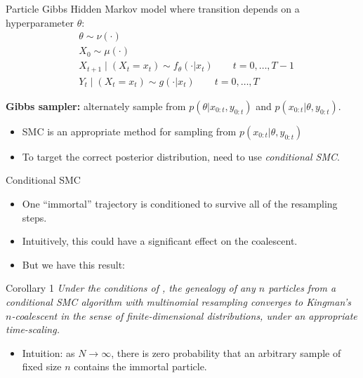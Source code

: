 \documentclass[aspectratio=169]{beamer}
\theoremstyle{definition}
\begin{document}
\begin{frame}{Particle Gibbs \citep{andrieu2010}}
Hidden Markov model where transition depends on a hyperparameter $\theta$:
\begin{align*}
& \theta \sim \nu(\cdot) \\
& X_0 \sim \mu(\cdot) \\
& X_{t+1} \mid (X_t = x_t) \sim f_{\theta}(\cdot | x_t)  \qquad t=0,\dots,T-1 \\
& Y_t \mid (X_t = x_t) \sim g(\cdot | x_t) \qquad t=0,\dots,T
\end{align*}

\textbf{Gibbs sampler:} alternately sample from $p(\theta | x_{0:t}, y_{0:t})$ and $p(x_{0:t} | \theta, y_{0:t})$.\\[7pt]

\begin{itemize}
\item SMC is an appropriate method for sampling from $p(x_{0:t} | \theta, y_{0:t})$
\item To target the correct posterior distribution, need to use \emph{conditional SMC}.
\end{itemize}
\end{frame}

\begin{frame}{Conditional SMC}
\begin{itemize}
\item One ``immortal'' trajectory is conditioned to survive all of the resampling steps.
\item Intuitively, this could have a significant effect on the coalescent. 

\item But we have this result:
\end{itemize}
\begin{block}{Corollary 1}
\textit{Under the conditions of \cite[Lemma 3]{koskela2018}
, the genealogy of any $n$ particles from a conditional SMC algorithm with multinomial resampling converges to Kingman's $n$-coalescent in the sense of finite-dimensional distributions, under an appropriate time-scaling.}
\end{block}

\begin{itemize}
\item Intuition: as $N\to\infty$, there is zero probability that an arbitrary sample of fixed size $n$ contains the immortal particle.
\end{itemize}
\end{frame}
\end{document}
